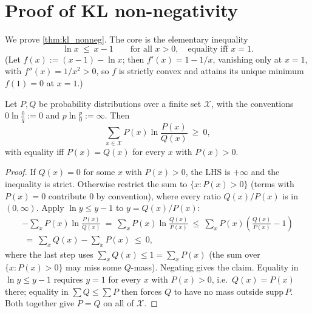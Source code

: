 \documentclass[fontsize=11pt, parskip=half]{scrartcl}
\begin{document}
\section{Proof of KL non-negativity}\label{app:kl_nonneg}

We prove \cref{thm:kl_nonneg}. The core is the elementary inequality
\[
  \ln x ~\leq~ x - 1 \qquad \text{for all } x > 0, \quad \text{equality iff } x = 1.
\]
(Let $f(x) := (x - 1) - \ln x$; then $f'(x) = 1 - 1/x$, vanishing only at $x = 1$, with $f''(x) = 1/x^2 > 0$, so $f$ is strictly convex and attains its unique minimum $f(1) = 0$ at $x = 1$.)

\begin{lemma}\label{lem:gibbs}
Let $P, Q$ be probability distributions over a finite set $\mathcal{X}$, with the conventions $0 \ln \tfrac{0}{q} := 0$ and $p \ln \tfrac{p}{0} := \infty$. Then
\[
  \sum_{x \in \mathcal{X}} P(x) \ln \frac{P(x)}{Q(x)} ~\geq~ 0,
\]
with equality iff $P(x) = Q(x)$ for every $x$ with $P(x) > 0$.
\end{lemma}

\begin{proof}
If $Q(x) = 0$ for some $x$ with $P(x) > 0$, the LHS is $+\infty$ and the inequality is strict. Otherwise restrict the sum to $\{x : P(x) > 0\}$ (terms with $P(x) = 0$ contribute $0$ by convention), where every ratio $Q(x)/P(x)$ is in $(0, \infty)$. Apply $\ln y \leq y - 1$ to $y = Q(x)/P(x)$:
\begin{align*}
  - \sum_x P(x) \ln \frac{P(x)}{Q(x)}
  ~=~ \sum_x P(x) \ln \frac{Q(x)}{P(x)}
  ~\leq~ \sum_x P(x) \left(\frac{Q(x)}{P(x)} - 1\right) \\
  ~=~ \sum_x Q(x) - \sum_x P(x) ~\leq~ 0,
\end{align*}
where the last step uses $\sum_x Q(x) \leq 1 = \sum_x P(x)$ (the sum over $\{x : P(x) > 0\}$ may miss some $Q$-mass). Negating gives the claim. Equality in $\ln y \leq y - 1$ requires $y = 1$ for every $x$ with $P(x) > 0$, i.e.\ $Q(x) = P(x)$ there; equality in $\sum Q \leq \sum P$ then forces $Q$ to have no mass outside $\mathrm{supp}\,P$. Both together give $P = Q$ on all of $\mathcal{X}$.
\end{proof}
\end{document}
